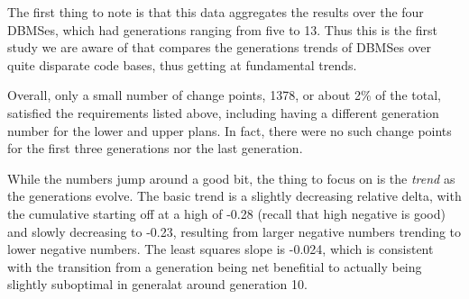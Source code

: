 \documentclass[prodmode,acmtods]{acmsmall}
\begin{document}
\begin{table}[t]
\end{table}

The first thing to note is that this data aggregates the results over the
four \hbox{DBMSes}, which had generations ranging from five to 13. Thus this is the
first study we are aware of that compares the generations trends of \hbox{DBMSes}
over quite disparate code bases, thus getting at fundamental trends.

Overall, only a small number of change points, 1378, or about 2\% of the
total, satisfied the
requirements listed above, including having a different generation number for
the lower and upper plans. In fact, there were no such change points for the
first three generations nor the last generation.

While the numbers jump around a good bit, the thing to focus on is the {\em
  trend} as the generations evolve.  The basic trend is a slightly
decreasing relative delta, with the cumulative starting off at a high of
-0.28 (recall that high negative is good) and slowly decreasing to -0.23,
resulting from larger negative numbers trending to lower negative
numbers. The least squares slope is -0.024, which is consistent with the
transition from a generation being net benefitial to actually being slightly
suboptimal in generalat around generation 10.
\end{document}

